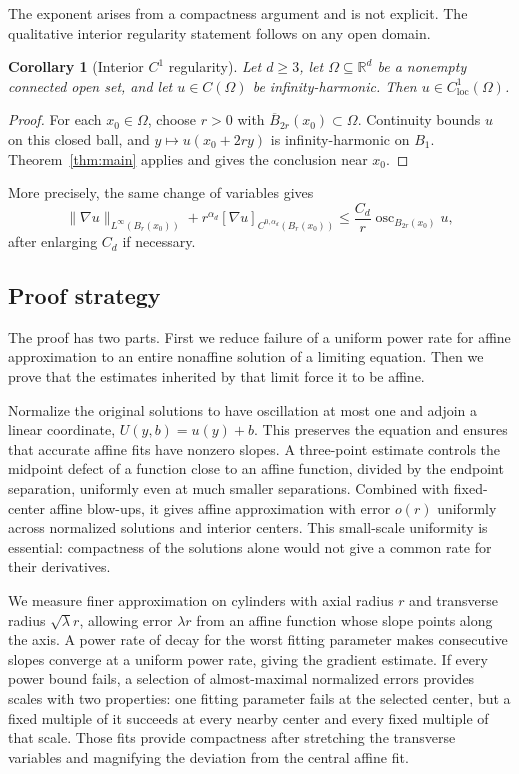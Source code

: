 \documentclass[11pt]{article}
\numberwithin{equation}{section}
\newtheorem{corollary}[theorem]{Corollary}
\theoremstyle{definition}
\theoremstyle{remark}
\newcommand{\R}{\mathbb{R}}
\DeclareMathOperator{\osc}{osc}
\begin{document}
The exponent arises from a compactness argument and is not explicit.
The qualitative interior regularity statement follows on any open domain.

\begin{corollary}[Interior $C^1$ regularity]\label{cor:interior-c1}
Let $d\ge3$, let $\Omega\subseteq\R^d$ be a nonempty connected open set,
and let $u\in C(\Omega)$ be infinity-harmonic. Then
$u\in C^1_{\mathrm{loc}}(\Omega)$.
\end{corollary}

\begin{proof}
For each $x_0\in\Omega$, choose $r>0$ with
$\overline B_{2r}(x_0)\subset\Omega$. Continuity bounds $u$ on this closed
ball, and $y\mapsto u(x_0+2ry)$ is infinity-harmonic on $B_1$.
Theorem~\ref{thm:main} applies and gives the conclusion near $x_0$.
\end{proof}

More precisely, the same change of variables gives
\[
 \|\nabla u\|_{L^\infty(B_r(x_0))}
   +r^{\alpha_d}[\nabla u]_{C^{0,\alpha_d}(B_r(x_0))}
   \le \frac{C_d}{r}\osc_{B_{2r}(x_0)}u,
\]
after enlarging $C_d$ if necessary.

\subsection{Proof strategy}
The proof has two parts. First we reduce failure of a uniform power
rate for affine approximation to an entire nonaffine solution of a
limiting equation. Then we prove that the estimates inherited by
that limit force it to be affine.

Normalize the original solutions to have oscillation at most one and
adjoin a linear coordinate, $U(y,b)=u(y)+b$. This preserves the equation
and ensures that accurate affine fits have nonzero slopes. A three-point
estimate controls the midpoint defect of a function close to an affine
function, divided by the endpoint separation, uniformly even at much
smaller separations. Combined with fixed-center affine blow-ups, it
gives affine approximation with error $o(r)$ uniformly across normalized
solutions and interior centers. This small-scale uniformity is essential:
compactness of the solutions alone would not give a common rate for
their derivatives.

We measure finer approximation on cylinders with axial radius $r$ and
transverse radius $\sqrt\lambda r$, allowing error $\lambda r$ from an
affine function whose slope points along the axis. A power rate of decay
for the worst fitting parameter makes consecutive slopes converge at a
uniform power rate, giving the gradient estimate. If every power bound
fails, a selection of almost-maximal normalized errors provides scales
with two properties: one fitting parameter fails at the selected center,
but a fixed multiple of it succeeds at every nearby center and every
fixed multiple of that scale. Those fits provide compactness after
stretching the transverse variables and magnifying the deviation from
the central affine fit.
\end{document}
